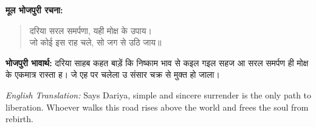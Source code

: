 \textbf{मूल भोजपुरी रचना:}

\begin{quote}
दरिया सरल समर्पणा, यही मोक्ष के उपाय।\\
जो कोई इस राह चले, सो जग से उठि जाय॥
\end{quote}

\textbf{भोजपुरी भावार्थ:} दरिया साहब कहत बाड़ें कि निष्काम भाव से कइल गइल सहज आ सरल समर्पण ही मोक्ष के एकमात्र रास्ता ह। जे एह पर चलेला उ संसार चक्र से मुक्त हो जाला।

\begin{sloppypar}
{\engfont \textit{English Translation:} Says Dariya, simple and sincere surrender is the only path to liberation.
Whoever walks this road rises above the world and frees the soul from rebirth.}
\end{sloppypar}
